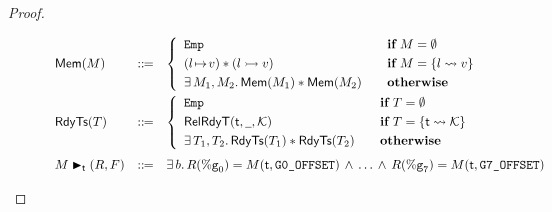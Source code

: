 \begin{proof}
\begin{enumerate}
        \begin{figure}[!t]
            \centering
            \[
                \begin{array}{lcl}
                    \centering
                    \MemRAsrt{\Mem} & \define & 
                    \left\{
                        \begin{array}{ll}
                            \empAst & \quad \cif \ \Mem = \emptyset \\
                            \\[-9pt]
                            (\msto{\loc}{\val}) \sepstar (\hmsto{\loc}{\val}) 
                            & \quad \cif \ \Mem = \{ \loc \rightsquigarrow \val \} \\
                            \\[-9pt]
                            \exists \, \Mem_1, \Mem_2. \,
                            \MemRAsrt{\Mem_1} \sepstar \MemRAsrt{\Mem_2}
                            & \quad \otherwise
                        \end{array}
                    \right. \\
                    \\[-8pt]
                    \RdyTsRAsrt{\thrdpool} & \define & 
                    \left\{
                        \begin{array}{ll}
                            \empAst & \quad \cif \ \thrdpool = \emptyset \\
                            \\[-9pt]
                            \RelRdyT{\thrdid}{\notCare}{\hthrdlocalst} & 
                            \quad \cif \ \thrdpool = \{ \thrdid \rightsquigarrow \hthrdlocalst \} \\
                            \\[-9pt]
                            \exists \, \thrdpool_1, \thrdpool_2. \, 
                            \RdyTsRAsrt{\thrdpool_1} \sepstar \RdyTsRAsrt{\thrdpool_2} & 
                            \quad \otherwise 
                        \end{array}
                    \right. \\
                    \\[-5pt]
                    \restoreCtx{\Mem}{\thrdid}{(\RFile, \Wstack)} & \define & 
                    \exists \, \block. \, 
                    \RFile(\greg{0}) = \Mem(\thrdid, \ofsGOne) \, \land \, \dots \, \land \, 
                    \RFile(\greg{7}) = \Mem(\thrdid, \ofsGEig) \\

\end{array}\]
\end{figure}
\end{enumerate}
\end{proof}
